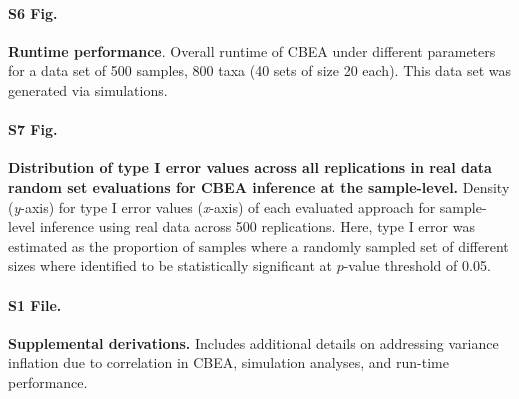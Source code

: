 \documentclass[10pt,letterpaper]{article}
\begin{document}
\paragraph*{S6 Fig.}
\label{S6_Fig}
{\bf Runtime performance}. Overall runtime of CBEA under different parameters for a data set of 500 samples, 800 taxa (40 sets of size 20 each). This data set was generated via simulations.

\paragraph*{S7 Fig.}
\label{S7_Fig}
{\bf Distribution of type I error values across all replications in real data random set evaluations for CBEA inference at the sample-level.} Density (\emph{y}-axis) for type I error values (\emph{x}-axis) of each evaluated approach for sample-level inference using real data across 500 replications. Here, type I error was estimated as the proportion of samples where a randomly sampled set of different sizes where identified to be statistically significant at $p$-value threshold of 0.05.  

\paragraph*{S1 File.}
\label{S1_File}
{\bf Supplemental derivations.} Includes additional details on addressing variance inflation due to correlation in CBEA, simulation analyses, and run-time performance.
\end{document}
